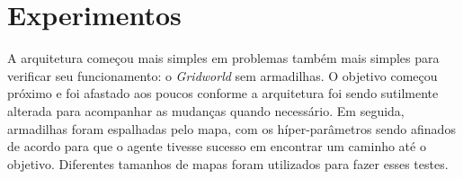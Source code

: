 \section{Experimentos}
\label{sec:experiments}

A arquitetura começou mais simples em problemas também mais simples para verificar seu funcionamento: o \textit{Gridworld} sem armadilhas.
O objetivo começou próximo e foi afastado aos poucos conforme a arquitetura foi sendo sutilmente alterada para acompanhar as mudanças quando necessário.
Em seguida, armadilhas foram espalhadas pelo mapa, com os híper-parâmetros sendo afinados de acordo para que o agente tivesse sucesso em encontrar um caminho até o objetivo.
Diferentes tamanhos de mapas foram utilizados para fazer esses testes.

